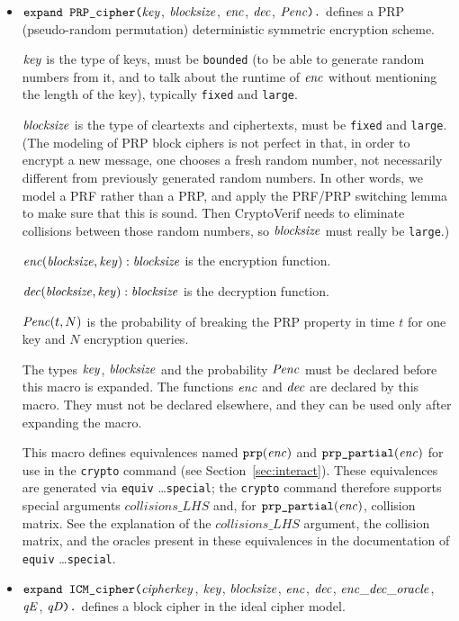 \documentclass{article}
\begin{document}
\begin{itemize}
\item $\texttt{expand PRP\_cipher(}\mathit{key}$,
$  \mathit{blocksize}$, $\mathit{enc}$, $\mathit{dec}$, $\mathit{Penc}\texttt{).}$
  defines a PRP (pseudo-random permutation) deterministic
  symmetric encryption scheme.

   $\mathit{key}$ is the type of keys, must be \texttt{bounded} (to be able to generate random numbers from it, and to talk about the runtime of $\mathit{enc}$ without mentioning the length of the key), typically \texttt{fixed} and \texttt{large}.

   $\mathit{blocksize}$ is the type of cleartexts and ciphertexts, must be
   \texttt{fixed} and \texttt{large}.
   (The modeling of PRP block ciphers is not perfect in that, in order
   to encrypt a new message, one chooses a fresh random number, not
   necessarily different from previously generated random numbers. In
   other words, we model a PRF rather than a PRP, and apply the
   PRF/PRP switching lemma to make sure that this is sound. Then
   CryptoVerif needs to eliminate collisions between those random
   numbers, so $\mathit{blocksize}$ must really be \texttt{large}.)

   $\mathit{enc}(\mathit{blocksize}, \mathit{key}): \mathit{blocksize}$ is the encryption function.

   $\mathit{dec}(\mathit{blocksize}, \mathit{key}): \mathit{blocksize}$ is the
  decryption function.

   $\mathit{Penc}(t, N)$ is the probability of breaking the PRP property
   in time $t$ for one key and $N$ encryption queries.

   The types $\mathit{key}$, $\mathit{blocksize}$ and the probability $\mathit{Penc}$ must
   be declared before this macro is expanded. The functions
   $\mathit{enc}$ and $\mathit{dec}$ are declared by this
   macro. They must not be declared elsewhere, and they can be used
   only after expanding the macro.

   This macro defines equivalences named $\texttt{prp}(\mathit{enc})$ and $\texttt{prp\_partial}(\mathit{enc})$
   for use in the \texttt{crypto} command 
   (see Section~\ref{sec:interact}). These equivalences are generated via \texttt{equiv} \dots \texttt{special};
   the \texttt{crypto} command therefore supports special arguments $\mathit{collisions\_LHS}$ and, 
   for $\texttt{prp\_partial}(\mathit{enc})$, collision matrix. See the explanation of the $\mathit{collisions\_LHS}$
   argument, the collision matrix, and the oracles present in these equivalences in the documentation of \texttt{equiv} \dots \texttt{special}.

\item $\texttt{expand ICM\_cipher(}\mathit{cipherkey}$, $\mathit{key}$, $\mathit{blocksize}$, $\mathit{enc}$,
$   \mathit{dec}$, $\mathit{enc\_dec\_oracle}$, $\mathit{qE}$, $\mathit{qD}\texttt{).}$
   defines a block cipher in the ideal cipher model.


\end{itemize}
\end{document}
